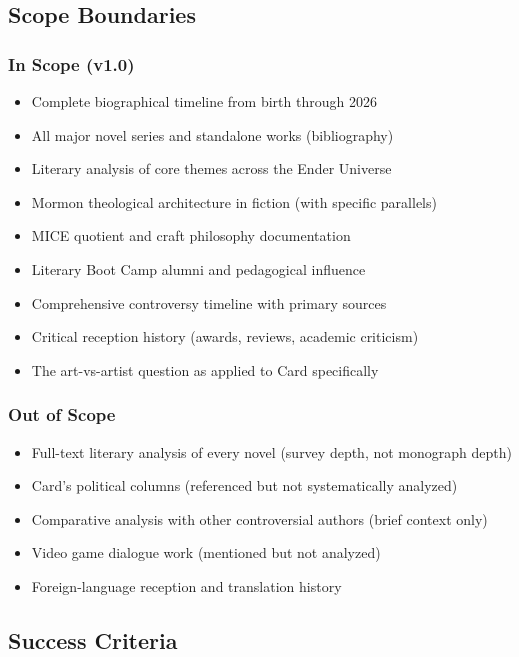 \documentclass[11pt,letterpaper]{article}
\begin{document}
\subsection{Scope Boundaries}

\subsubsection{In Scope (v1.0)}

\begin{itemize}[leftmargin=2em]
  \item Complete biographical timeline from birth through 2026
  \item All major novel series and standalone works (bibliography)
  \item Literary analysis of core themes across the Ender Universe
  \item Mormon theological architecture in fiction (with specific parallels)
  \item MICE quotient and craft philosophy documentation
  \item Literary Boot Camp alumni and pedagogical influence
  \item Comprehensive controversy timeline with primary sources
  \item Critical reception history (awards, reviews, academic criticism)
  \item The art-vs-artist question as applied to Card specifically
\end{itemize}

\subsubsection{Out of Scope}

\begin{itemize}[leftmargin=2em]
  \item Full-text literary analysis of every novel (survey depth, not monograph depth)
  \item Card's political columns (referenced but not systematically analyzed)
  \item Comparative analysis with other controversial authors (brief context only)
  \item Video game dialogue work (mentioned but not analyzed)
  \item Foreign-language reception and translation history
\end{itemize}

\subsection{Success Criteria}
\end{document}
